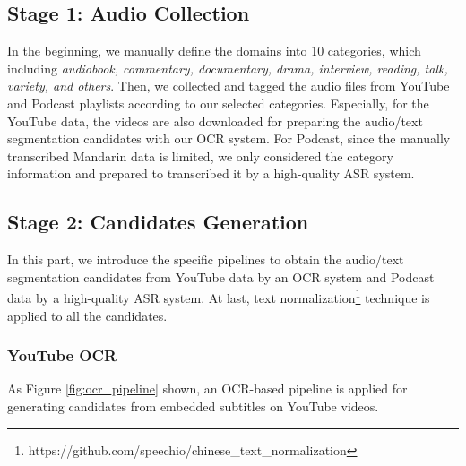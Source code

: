 \documentclass{article}
\begin{document}
\vspace{-1em}
\subsection{Stage 1: Audio Collection}
\vspace{-0.5em}
In the beginning, we manually define the domains into 10 categories, which including \textit{audiobook, commentary, documentary, drama, interview, reading, talk, variety, and others}. Then, we collected and tagged the audio files from YouTube and Podcast playlists according to our selected categories. Especially, for the YouTube data, the videos are also downloaded for preparing the audio/text segmentation candidates with our OCR system. For Podcast, since the manually transcribed Mandarin data is limited, we only considered the category information and prepared to transcribed it by a high-quality ASR system.  

\vspace{-1em}
\subsection{Stage 2: Candidates Generation}
\vspace{-0.5em}
In this part, we introduce the specific pipelines to obtain the audio/text segmentation candidates from YouTube data by an OCR system and Podcast data by a high-quality ASR system. At last, text normalization\footnote{https://github.com/speechio/chinese\_text\_normalization} technique is applied to all the candidates.

\vspace{-1em}
\subsubsection{YouTube OCR}
\vspace{-0.5em}

As Figure \ref{fig:ocr_pipeline} shown, an OCR-based pipeline is applied for generating candidates from embedded subtitles on YouTube videos.
\end{document}
